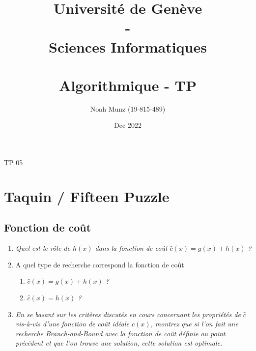 \documentclass[french]{article}
\title{\vspace{-2cm}
   {\huge Université de Genève \\ - \\ Sciences Informatiques} \\
    \vspace{0.6cm}
    \unilogo{0.38} \\ 
    \vspace{1.1cm}
    {\huge Algorithmique - TP \nb}
    \vspace{0.1cm}
}
\author{Noah Munz (19-815-489)}
\date{Dec 2022}
\newcommand{\nb}{05}
\begin{document}
%
\maketitle
\vspace{0.5cm}
\tableofcontents
\thispagestyle{empty}
\clearpage
\setcounter{page}{1}
%
%
\begin{center}
	{\huge TP \nb}
\end{center}
\vspace{0.3cm}
%
\section{Taquin / Fifteen Puzzle}

\subsection{Fonction de coût}
\vspace{0.4cm}


\begin{enumerate}[label=(\alph*)]
	\item \textit{Quel est le rôle de $h(x)$ dans la fonction de coût $\hat{c}(x) = g(x) + h(x)$ ?}
	\item A quel type de recherche correspond la fonction de coût
	\begin{enumerate}[label=\arabic*)]
		\item \textit{$\hat{c}(x) = g(x) + h(x)$ ?}
		\item \textit{$\hat{c}(x) = h(x)$ ?}
	\end{enumerate}
	\item  \textit{En se basant sur les critères discutés en cours concernant les propriétés de $\hat{c}$
	vis-à-vis d'une fonction de coût idéale $c(x)$, montrez que si l'on fait une recherche Branch-and-Bound 
	avec la fonction de coût définie au point précédent et que l'on trouve une solution, cette solution est optimale.}\\
\end{enumerate}
\end{document}
